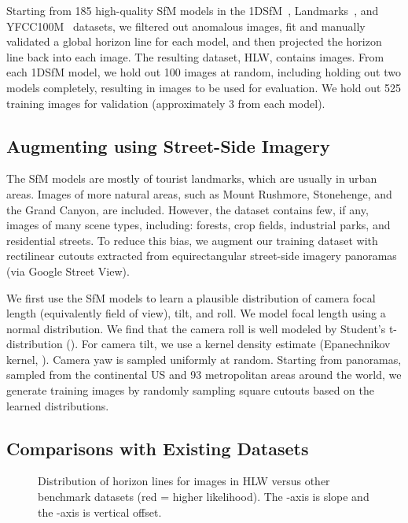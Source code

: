 \documentclass{bmvc2k}
\begin{document}
Starting from 185 high-quality SfM models in the
1DSfM~\cite{wilson2014robust}, Landmarks~\cite{li2012worldwide}, and
YFCC100M~\cite{heinly2015reconstructing} datasets, we filtered out
anomalous images, fit and manually validated a global horizon line for
each model, and then projected the horizon line back into each image. The
resulting dataset, HLW, contains  images. From
each 1DSfM model, we hold out 100 images at random, including holding
out two models completely, resulting in  images to be used for
evaluation. We hold out 525 training images for validation (approximately 3
from each model). 

\subsection{Augmenting using Street-Side Imagery}

The SfM models are mostly of tourist landmarks, which are usually in
urban areas. Images of more natural areas, such as Mount Rushmore,
Stonehenge, and the Grand Canyon, are included.  However, the dataset
contains few, if any, images of many scene types, including: forests,
crop fields, industrial parks, and residential streets. To reduce this
bias, we augment our training dataset with rectilinear cutouts
extracted from equirectangular street-side imagery panoramas (via
Google Street View).  

We first use the SfM models to learn a
plausible distribution of camera focal length (equivalently field of
view), tilt, and roll.  We model focal length using a normal
distribution. We find that the camera roll is well modeled by
Student's t-distribution (). For camera tilt, we use a kernel
density estimate (Epanechnikov kernel, ).  Camera yaw is
sampled uniformly at random. Starting from  panoramas,
sampled from the continental US and 93 metropolitan areas around the
world, we generate  training images by randomly sampling
square cutouts based on the learned distributions. 

\subsection{Comparisons with Existing Datasets}
\label{sec:comparison}

\begin{figure}

  \centering
 

  \caption{Distribution of horizon lines for images in HLW versus
  other benchmark datasets (red = higher likelihood). The -axis is
slope and the -axis is vertical offset.}

  \label{fig:horizon_dists}

\end{figure}
\end{document}

